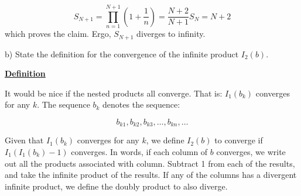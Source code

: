 \documentclass{article}
\newcommand{\new}[1]{
    \vspace{2mm}
    \noindent
    \textbf{
    \underline{#1}}
}
\begin{document}
\[
    S_{N+1} = \prod^{N+1}_{n=1}(1+\frac{1}{n})
    =\frac{N+2}{N+1} S_{N} = N+2
\]
which proves the claim. Ergo, $S_{N+1}$ diverges to infinity. 

\vspace{5mm}
b) State the definition for the convergence of the infinite product 
$I_2(b)$.

\new{Definition}
It would be nice if the nested products all converge. That is:
$I_1(b_k)$ converges for any $k$. The sequence $b_k$ denotes the 
sequence:

\[
    b_{k1}, b_{k2}, b_{k3}, \dots, b_{kn}, \dots
\]

Given that $I_1(b_k)$ converges for any $k$, we define $I_2(b)$ 
to converge if $I_1(I_1(b_k) - 1)$ converges. In words, if each 
column of $b$ converges, we write out all the products associated 
with column. Subtract 1 from each of the results, and take 
the infinite product of the results. If any of the columns 
has a divergent infinite product, we define the doubly product 
to also diverge. 
\end{document}
